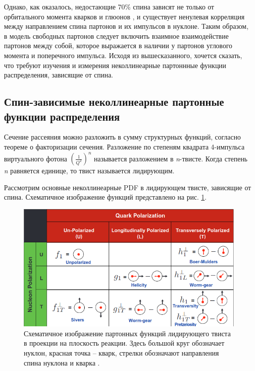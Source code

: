 \documentclass{extreport}
\begin{document}
Однако, как оказалось, недостающие 70\% спина зависят не только от орбитального момента кварков и глюонов \cite{Hagler}, и существует ненулевая корреляция между направлением спина партонов и их импульсов в нуклоне. Таким образом, в модель свободных партонов следует включить взаимное взаимодействие партонов между собой, которое выражается в наличии у партонов углового момента и поперечного импульса. Исходя из вышесказанного, хочется сказать, что требуют изучения и измерения неколлинеарные партоннные функции распределения, зависящие от спина.


\subsection{Спин-зависимые неколлинеарные партонные функции распределения}

Сечение рассеяния можно разложить в сумму структурных функций, согласно теореме о факторизации сечения. Разложение по степеням квадрата 4-импульса виртуального фотона $(\frac{1}{Q^2})^n$ называется разложением в \textit{n}-твисте. Когда степень \textit{n} равняется единице, то твист называется лидирующим. 

Рассмотрим основные неколлинеарные PDF в лидирующем твисте, зависящие от спина.  Схематичное изображение функций представлено на рис. \ref{fig:functions}.

\begin{figure}[h]
	\centering
	\includegraphics[width=\linewidth]{functions.png}
	\caption{Схематичное изображение партонных функций лидирующего твиста в проекции на плоскость реакции. Здесь большой круг обозначает нуклон, красная точка -- кварк, стрелки обозначают направления спина нуклона и кварка \cite{Boussarie_2023}.}
	\label{fig:functions}
\end{figure} 
 
\end{document}
